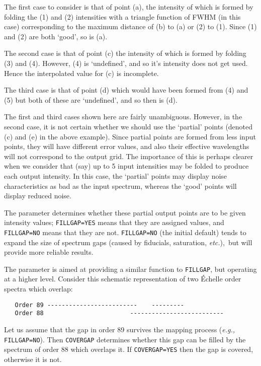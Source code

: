 The first case to consider is that of point (a), the intensity of which is
formed by folding the (1) and (2) intensities with a triangle function of FWHM
(in this case) corresponding to the maximum distance of (b) to (a) or (2) to
(1).  Since (1) and (2) are both `good', so is (a)\@.

The second case is that of point (c) the intensity of which is formed by
folding (3) and (4)\@.  However, (4) is `undefined', and so it's intensity does
not get used.  Hence the interpolated value for (c) is incomplete.

The third case is that of point (d) which would have been formed from (4)
and (5) but both of these are `undefined', and so then is (d)\@.

The first and third cases shown here are fairly unambiguous.  However, in
the second case, it is not certain whether we should use the `partial' points
(denoted (c) and (e) in the above example)\@.  Since partial points are formed
from less input points, they will have different error values, and also their
effective wavelengths will not correspond to the output grid.  The
importance of this is perhaps clearer when we consider that (say) up to 5 input
intensities may be folded to produce each output intensity.  In this case,
the `partial' points may display noise characteristics as bad as the input
spectrum, whereas the `good' points will display reduced noise.

The  parameter determines whether these
partial output points are
to be given intensity values; \verb+FILLGAP=YES+ means that they are assigned
values, and \verb+FILLGAP=NO+ means that they are not.  \verb+FILLGAP=NO+ (the
initial default) tends to expand the size of spectrum gaps (caused by
fiducials, saturation, {\it etc.}),\ but will provide more reliable results.

The 
 parameter is aimed at providing a similar function to
\verb+FILLGAP+, but operating at a higher level.  Consider this schematic
representation of two \'{E}chelle order spectra which overlap:

\begin{verbatim}
   Order 89 -------------------------    ---------
   Order 88                        --------------------------
\end{verbatim}

Let us assume that the gap in order 89 survives the mapping process
({\it{e.g.,}} \verb+FILLGAP=NO+)\@.  Then \verb+COVERGAP+ determines whether
this gap can be filled by the spectrum of order 88 which overlaps it.  If
\verb+COVERGAP=YES+ then the gap is covered, otherwise it is not.


